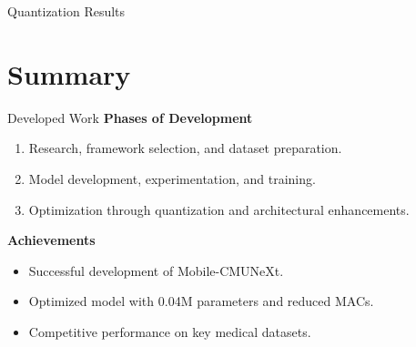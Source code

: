 \documentclass[aspectratio=169,xcolor=dvipsnames]{beamer}
\newcommand{\vtab}{\vspace{0.3cm}}
\begin{document}
\begin{frame}{Quantization Results}
    \begin{table}
        \fittowidth[.8\textwidth]{}
        \caption{Mobile-CMUNeXt Quantized Results}
    \end{table}
\end{frame}





\section{Summary}


\begin{frame}{Developed Work}
    \textbf{Phases of Development}
    \begin{enumerate}
        \item Research, framework selection, and dataset preparation.
        \item Model development, experimentation, and training.
        \item Optimization through quantization and architectural enhancements.
    \end{enumerate}
    \vtab
    \textbf{Achievements}
    \begin{itemize}
        \item Successful development of Mobile-CMUNeXt.
        \item Optimized model with 0.04M parameters and reduced MACs.
        \item Competitive performance on key medical datasets.
    \end{itemize}
\end{frame}
\end{document}
